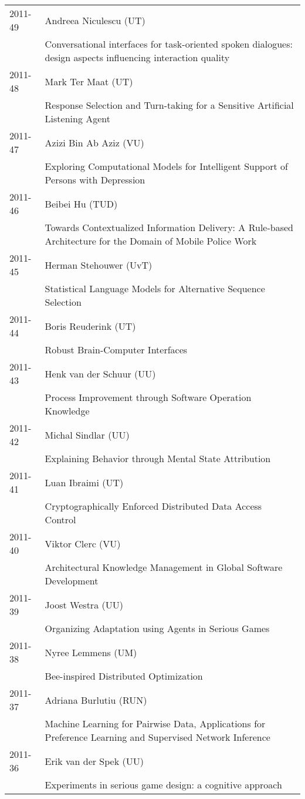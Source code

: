 \begin{longtable}{p{1.25cm}p{10.75cm}}
2011-49 & Andreea Niculescu (UT) \\& Conversational interfaces for task-oriented spoken dialogues: design \newline aspects influencing interaction quality \\
2011-48 & Mark Ter Maat (UT) \\& Response Selection and Turn-taking for a Sensitive Artificial Listening Agent \\
2011-47 & Azizi Bin Ab Aziz (VU) \\& Exploring Computational Models for Intelligent Support of Persons with Depression \\
2011-46 & Beibei Hu (TUD) \\& Towards Contextualized Information Delivery: A Rule-based Architecture for the Domain of Mobile Police Work \\
2011-45 & Herman Stehouwer (UvT) \\& Statistical Language Models for Alternative Sequence Selection \\
2011-44 & Boris Reuderink (UT) \\& Robust Brain-Computer Interfaces \\
2011-43 & Henk van der Schuur (UU) \\& Process Improvement through Software Operation Knowledge \\
2011-42 & Michal Sindlar (UU) \\& Explaining Behavior through Mental State Attribution \\
2011-41 & Luan Ibraimi (UT) \\& Cryptographically Enforced Distributed Data Access Control \\
2011-40 & Viktor Clerc (VU) \\& Architectural Knowledge Management in Global Software Development \\
2011-39 & Joost Westra (UU) \\& Organizing Adaptation using Agents in Serious Games \\
2011-38 & Nyree Lemmens (UM) \\& Bee-inspired Distributed Optimization \\
2011-37 & Adriana Burlutiu (RUN) \\& Machine Learning for Pairwise Data, Applications for Preference Learning and Supervised Network Inference \\
2011-36 & Erik van der Spek (UU) \\& Experiments in serious game design: a cognitive approach \\

\end{longtable}
